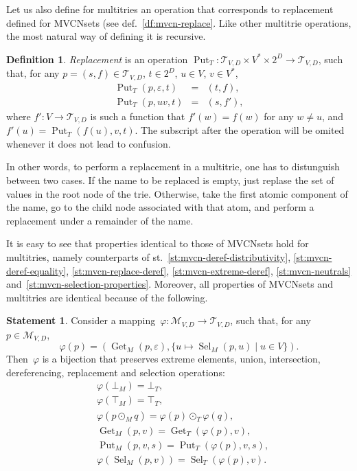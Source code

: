 \documentclass{article}
\theoremstyle{definition}
\newtheorem{Df}{Definition}
\newtheorem{St}{Statement}
\newcommand{\setcharmvcn}{M}
\newcommand{\setcharmt}{T}
\newcommand{\setsymbol}[3]{\mathcal{#1}_{#2,#3}}
\newcommand{\setmvcn}[2]{\setsymbol{\setcharmvcn}{#1}{#2}}
\newcommand{\setmt}[2]{\setsymbol{\setcharmt}{#1}{#2}}
\newcommand{\select}{\operatorname{Sel}}
\newcommand{\deref}{\operatorname{Get}}
\newcommand{\putval}{\operatorname{Put}}
\begin{document}
Let us also define for multitries an operation that corresponds to replacement
defined for MVCNsets (see def.~\ref{df:mvcn-replace}. Like other multitrie
operations, the most natural way of defining it is recursive.
\begin{Df}\label{df:mt-replace}
\emph{Replacement} is an operation $\putval_\setcharmt : \setmt{V}{D}
\times V^\ast \times 2^D \to \setmt{V}{D}$, such that, for any
$p = (s, f) \in \setmt{V}{D}$, $t \in 2^D$, $u \in V$, $v \in V^\ast$,
\begin{eqnarray*}
  \putval_\setcharmt(p, \varepsilon, t) & = & (t, f) , \\
  \putval_\setcharmt(p, u v, t) & = & (s, f') ,
\end{eqnarray*}
where $f' : V \to \setmt{V}{D}$ is such a function that $f'(w) = f(w)$ for any
$w\neq u$, and $f'(u) = \putval_\setcharmt(f(u), v, t)$.
The subscript after the operation will be omited whenever it does not lead to
confusion.
\end{Df}

In other words, to perform a replacement in a multitrie, one has to distunguish
between two cases. If the name to be replaced is empty, just replase the set of
values in the root node of the trie. Otherwise, take the first atomic component
of the name, go to the child node associated with that atom, and perform a
replacement under a remainder of the name.

It is easy to see that properties identical to those of MVCNsets
hold for multitries, namely counterparts of
st.~\ref{st:mvcn-deref-distributivity},
\ref{st:mvcn-deref-equality},
\ref{st:mvcn-replace-deref},
\ref{st:mvcn-extreme-deref},
\ref{st:mvcn-neutrals}
and~\ref{st:mvcn-selection-properties}.
Moreover, all properties of MVCNsets and multitries are identical because
of the following.

\begin{St}\label{st:isomorph}
Consider a mapping~$\varphi: \setmvcn{V}{D} \to \setmt{V}{D}$, such that,
for any~$p\in \setmvcn{V}{D}$,
\[
  \varphi(p) = (
    \deref_\setcharmvcn(p, \varepsilon) ,
    \{ u \mapsto \select_\setcharmvcn(p, u) \mid u\in V \}
  ) .
\]
Then~$\varphi$ is a bijection that preserves
extreme elements, union, intersection, dereferencing, replacement and selection
operations:
\begin{eqnarray*}
  & \varphi(\bot_{\setcharmvcn}) = \bot_{\setcharmt}, \\
  & \varphi(\top_{\setcharmvcn}) = \top_{\setcharmt}, \\
  & \varphi(p \mathbin{\odot_{\setcharmvcn}} q) =
      \varphi(p) \mathbin{\odot_{\setcharmt}} \varphi(q) , \\
  & \deref_{\setcharmvcn}(p, v) =
      \deref_{\setcharmt}(\varphi(p), v) , \\
  & \putval_{\setcharmvcn}(p, v, s) =
      \putval_{\setcharmt}(\varphi(p), v, s) , \\
  & \varphi(\select_{\setcharmvcn}(p, v)) =
      \select_{\setcharmt}(\varphi(p), v) .
\end{eqnarray*}
\end{St}
\end{document}
